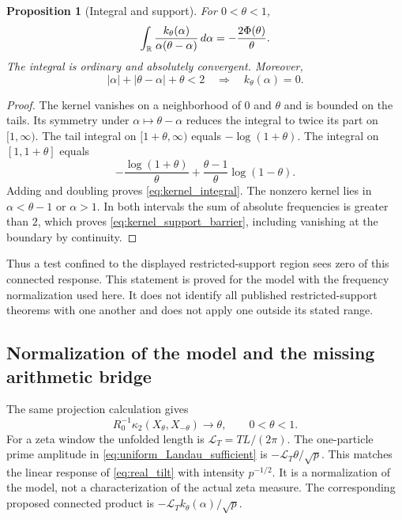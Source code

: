 \documentclass[11pt,reqno]{amsart}
\theoremstyle{plain}\newtheorem{theorem}{Theorem}[section]\newtheorem{proposition}[theorem]{Proposition}\newtheorem{lemma}[theorem]{Lemma}\newtheorem{corollary}[theorem]{Corollary}
\theoremstyle{definition}\newtheorem{hypothesis}[theorem]{Hypothesis}\newtheorem{definition}[theorem]{Definition}
\theoremstyle{remark}\newtheorem{remark}[theorem]{Remark}\newtheorem{experiment}[theorem]{Experiment}\newtheorem{question}[theorem]{Question}\newtheorem{heuristic}[theorem]{Heuristic}\newtheorem{conjecture}[theorem]{Conjecture}
\begin{document}
\begin{proposition}[Integral and support]\label{prop:kernel_integral}
For $0<\theta<1$,
\begin{equation}
 \int_\mathbb R\frac{k_\theta(\alpha)}{\alpha(\theta-\alpha)}\,d\alpha
       =-\frac{2\Phi(\theta)}{\theta}.
 \label{eq:kernel_integral}
\end{equation}
The integral is ordinary and absolutely convergent. Moreover,
\begin{equation}
 |\alpha|+|\theta-\alpha|+\theta<2
       \quad\Longrightarrow\quad k_\theta(\alpha)=0.
 \label{eq:kernel_support_barrier}
\end{equation}
\end{proposition}
\begin{proof}
The kernel vanishes on a neighborhood of $0$ and $\theta$ and is bounded on the tails. Its symmetry under $\alpha\mapsto\theta-\alpha$ reduces the integral to twice its part on $[1,\infty)$. The tail integral on $[1+\theta,\infty)$ equals $-\log(1+\theta)$. The integral on $[1,1+\theta]$ equals
\begin{equation}
 -\frac{\log(1+\theta)}{\theta}
       +\frac{\theta-1}{\theta}\log(1-\theta).
 \label{eq:kernel_ramp_integral}
\end{equation}
Adding and doubling proves \eqref{eq:kernel_integral}. The nonzero kernel lies in $\alpha<\theta-1$ or $\alpha>1$. In both intervals the sum of absolute frequencies is greater than $2$, which proves \eqref{eq:kernel_support_barrier}, including vanishing at the boundary by continuity.
\end{proof}
Thus a test confined to the displayed restricted-support region sees zero of this connected response. This statement is proved for the model with the frequency normalization used here. It does not identify all published restricted-support theorems with one another and does not apply one outside its stated range.

\subsection{Normalization of the model and the missing arithmetic bridge}
\label{subsec:model_bridge}
The same projection calculation gives
\begin{equation}
 R_0^{-1}\kappa_2(X_\theta,X_{-\theta})\longrightarrow\theta,
 \qquad 0<\theta<1.
 \label{eq:sine_susceptibility}
\end{equation}
For a zeta window the unfolded length is $\mathscr L_T=TL/(2\pi)$. The one-particle prime amplitude in \eqref{eq:uniform_Landau_sufficient} is $-\mathscr L_T\theta/\sqrt p$. This matches the linear response of \eqref{eq:real_tilt} with intensity $p^{-1/2}$. It is a normalization of the model, not a characterization of the actual zeta measure. The corresponding proposed connected product is $-\mathscr L_Tk_\theta(\alpha)/\sqrt p$.
\end{document}
